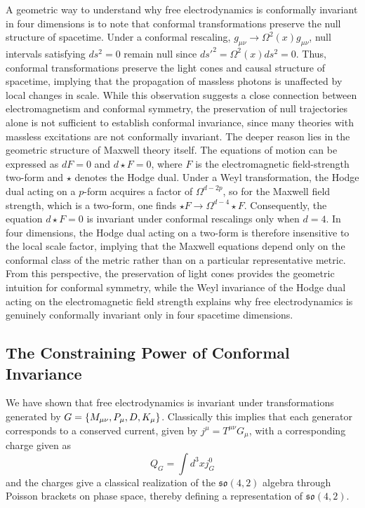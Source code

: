 \documentclass{article}
\begin{document}
A geometric way to understand why free electrodynamics is conformally invariant in four dimensions is to note that conformal transformations preserve the null structure of spacetime. Under a conformal rescaling, $g_{\mu\nu}\rightarrow \Omega^2(x)g_{\mu\nu}$, null intervals satisfying $ds^2=0$ remain null since $ds'^2=\Omega^2(x)ds^2=0$. Thus, conformal transformations preserve the light cones and causal structure of spacetime, implying that the propagation of massless photons is unaffected by local changes in scale. While this observation suggests a close connection between electromagnetism and conformal symmetry, the preservation of null trajectories alone is not sufficient to establish conformal invariance, since many theories with massless excitations are not conformally invariant. The deeper reason lies in the geometric structure of Maxwell theory itself. The equations of motion can be expressed as $dF=0$ and $d\star F=0$, where $F$ is the electromagnetic field-strength two-form and $\star$ denotes the Hodge dual. Under a Weyl transformation, the Hodge dual acting on a $p$-form acquires a factor of $\Omega^{d-2p}$, so for the Maxwell field strength, which is a two-form, one finds $\star F\rightarrow \Omega^{d-4}\star F$. Consequently, the equation $d\star F=0$ is invariant under conformal rescalings only when $d=4$. In four dimensions, the Hodge dual acting on a two-form is therefore insensitive to the local scale factor, implying that the Maxwell equations depend only on the conformal class of the metric rather than on a particular representative metric. From this perspective, the preservation of light cones provides the geometric intuition for conformal symmetry, while the Weyl invariance of the Hodge dual acting on the electromagnetic field strength explains why free electrodynamics is genuinely conformally invariant only in four spacetime dimensions.

\subsection{The Constraining Power of Conformal Invariance}
We have shown that free electrodynamics is invariant under transformations generated by $G = \{M_{\mu\nu},P_\mu,D, \\K_\mu\}$. Classically this implies that each generator corresponds to a conserved current, given by $j^\mu = T^{\mu\nu}G_\mu$, with a corresponding charge given as 
\begin{equation}
    Q_G = \int d^3x j^0_G
\end{equation}
and the charges give a classical realization of the $\mathfrak{so}(4,2)$ algebra through Poisson brackets on phase space, thereby defining a representation of $\mathfrak{so}(4,2)$. 
\end{document}
